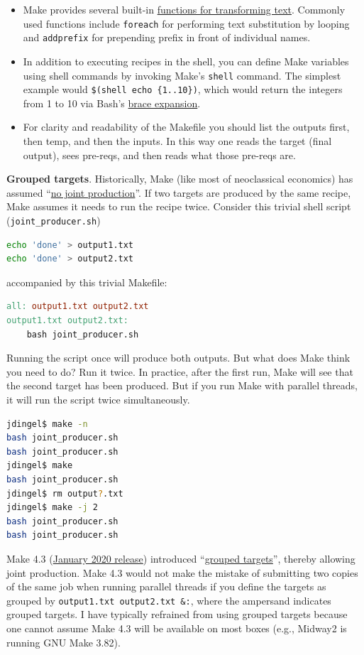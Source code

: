 \begin{itemize}
Order-only prerequisites are defined by listing them after the pipe symbol: \texttt{output: normal prerequisites | order-only prerequisites}.
\item Make provides several built-in \href{https://www.gnu.org/software/make/manual/html_node/Functions.html\#Functions}{functions for transforming text}.
Commonly used functions include \texttt{foreach} for performing text substitution by looping
and \texttt{addprefix} for prepending prefix in front of individual names.
\item In addition to executing recipes in the shell, you can define Make variables using shell commands by invoking Make's \texttt{shell} command.
The simplest example would \texttt{\$(shell echo \{1..10\})}, which would return the integers from 1 to 10 via Bash's \href{https://www.shell-tips.com/bash/seq-brace-expansion/}{brace expansion}.
\item For clarity and readability of the Makefile you should list the outputs first, then temp, and then the inputs.
In this way one reads the target (final output), sees pre-reqs, and then reads what those pre-reqs are.
\end{itemize}

\textbf{Grouped targets}.
Historically, Make (like most of neoclassical economics) has assumed 
``\href{https://doi.org/10.2307/2525367}{no joint production}''.
If two targets are produced by the same recipe, Make assumes it needs to run the recipe twice.
Consider this trivial shell script (\texttt{joint\_producer.sh})
\begin{lstlisting}[language=bash]
echo 'done' > output1.txt
echo 'done' > output2.txt
\end{lstlisting}
accompanied by this trivial Makefile:
\begin{lstlisting}[language=make]
all: output1.txt output2.txt
output1.txt output2.txt:
	bash joint_producer.sh
\end{lstlisting}
Running the script once will produce both outputs.
But what does Make think you need to do? Run it twice.
In practice, after the first run, Make will see that the second target has been produced.
But if you run Make with parallel threads, it will run the script twice simultaneously.
\begin{lstlisting}[language=bash]
jdingel$ make -n
bash joint_producer.sh
bash joint_producer.sh
jdingel$ make
bash joint_producer.sh
jdingel$ rm output?.txt
jdingel$ make -j 2
bash joint_producer.sh
bash joint_producer.sh
\end{lstlisting}
Make 4.3 (\href{https://lwn.net/Articles/810071/}{January 2020 release}) introduced
``\href{https://www.gnu.org/software/make/manual/html_node/Multiple-Targets.html}{grouped targets}'',
thereby allowing joint production.
Make 4.3 would not make the mistake of submitting two copies of the same job when running parallel threads if you define the targets as grouped by \texttt{output1.txt output2.txt \&:},
where the ampersand indicates grouped targets.
I have typically refrained from using grouped targets because one cannot assume Make 4.3 will be available on most boxes (e.g., Midway2 is running GNU Make 3.82).

